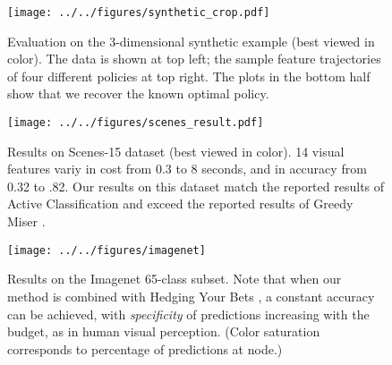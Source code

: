 \begin{figure}[h!]
\centering
\texttt{[image: ../../figures/synthetic\_crop.pdf]}
\vspace{-2em}
\caption{
Evaluation on the 3-dimensional synthetic example (best viewed in color).
The data is shown at top left; the sample feature trajectories of four different policies at top right.
The plots in the bottom half show that we recover the known optimal policy.
}
\texttt{[image: ../../figures/scenes\_result.pdf]}
\caption{
Results on Scenes-15 dataset (best viewed in color).
14 visual features variy in cost from 0.3 to 8 seconds, and in accuracy from 0.32 to .82.
Our results on this dataset match the reported results of Active Classification \cite{Gao-NIPS-2011} and exceed the reported results of Greedy Miser \cite{Xu-ICML-2012}.
\label{fig:scenes}
}
\texttt{[image: ../../figures/imagenet]}
\vspace{-1em}
\caption{
Results on the Imagenet 65-class subset. Note that when our method is combined with Hedging Your Bets \cite{Deng-CVPR-2012}, a constant accuracy can be achieved, with \emph{specificity} of predictions increasing with the budget, as in human visual perception.
(Color saturation corresponds to percentage of predictions at node.)
\label{fig:imagenet}}
\end{figure}



